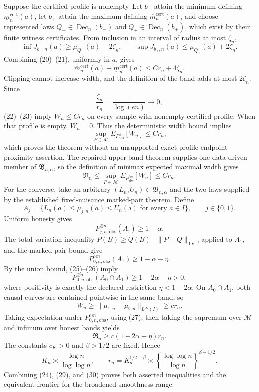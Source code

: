 Suppose the certified profile is nonempty.  Let \(b_-\) attain the minimum defining \(\underline m_n^{\mathrm{cert}}(a)\), let \(b_+\) attain the maximum defining \(\overline m_n^{\mathrm{cert}}(a)\), and choose represented laws \(Q_-\in\operatorname{Dec}_n(b_-)\) and \(Q_+\in\operatorname{Dec}_n(b_+)\), which exist by their finite witness certificates.  From inclusion in an interval of radius at most \(\zeta_n\),
\[
 \inf J_{b_-,n}(a)\ge\mu_{Q_-}(a)-2\zeta_n,
 \qquad
 \sup J_{b_+,n}(a)\le\mu_{Q_+}(a)+2\zeta_n.                 \tag{21}
\]
Combining (20)--(21), uniformly in \(a\), gives
\[
 \overline m_n^{\mathrm{cert}}(a)-
 \underline m_n^{\mathrm{cert}}(a)
 \le C r_n+4\zeta_n.                                        \tag{22}
\]
Clipping cannot increase width, and the definition of the band adds at most \(2\zeta_n\).  Since
\[
 \frac{\zeta_n}{r_n}=\frac1{\log(en)}\longrightarrow0,      \tag{23}
\]
(22)--(23) imply \(W_n\le C r_n\) on every sample with nonempty certified profile.  When that profile is empty, \(W_n=0\).  Thus the deterministic width bound implies
\[
 \sup_{P\in\mathcal M}
 E_{P_{\mathrm{obs}}^{\otimes n}}[W_n]\le C r_n,
\]
which proves the theorem without an unsupported exact-profile endpoint-proximity assertion.
The repaired upper-band theorem supplies one data-driven member of \(\mathfrak B_{n,\alpha}\), so the definition of minimax expected maximal width gives
\[
 \mathfrak R_n
 \le\sup_{P\in\mathcal M}E_{P_{\mathrm{obs}}^{\otimes n}}[W_n]
 \le C r_n.                                                   \tag{24}
\]
For the converse, take an arbitrary \((L_n,U_n)\in\mathfrak B_{n,\alpha}\) and the two laws supplied by the established fixed-nuisance marked-pair theorem.  Define
\[
 A_j=\{L_n(a)\le\mu_{j,n}(a)\le U_n(a)
          \text{ for every }a\in I\},\qquad j\in\{0,1\}.
\]
Uniform honesty gives
\[
 P_{j,n,\mathrm{obs}}^{\otimes n}(A_j)\ge1-\alpha.           \tag{25}
\]
The total-variation inequality \(P(B)\ge Q(B)-\|P-Q\|_{\mathrm{TV}}\), applied to \(A_1\), and the marked-pair bound give
\[
 P_{0,n,\mathrm{obs}}^{\otimes n}(A_1)
 \ge1-\alpha-\eta.                                          \tag{26}
\]
By the union bound, (25)--(26) imply
\[
 P_{0,n,\mathrm{obs}}^{\otimes n}(A_0\cap A_1)
 \ge1-2\alpha-\eta>0,                                       \tag{27}
\]
where positivity is exactly the declared restriction \(\eta<1-2\alpha\).  On \(A_0\cap A_1\), both causal curves are contained pointwise in the same band, so
\[
 W_n\ge\|\mu_{1,n}-\mu_{0,n}\|_{L^\infty(I)}\ge c r_n.     \tag{28}
\]
Taking expectation under \(P_{0,n,\mathrm{obs}}^{\otimes n}\), using (27), then taking the supremum over \(\mathcal M\) and infimum over honest bands yields
\[
 \mathfrak R_n\ge c(1-2\alpha-\eta)r_n.                     \tag{29}
\]
The constants \(c_K>0\) and \(\beta>1/2\) are fixed.  Hence
\[
 K_n\asymp\frac{\log n}{\log\log n},
 \qquad
 r_n=K_n^{1/2-\beta}
 \asymp\left\{\frac{\log\log n}{\log n}\right\}^{\beta-1/2}. \tag{30}
\]
Combining (24), (29), and (30) proves both asserted inequalities and the equivalent frontier for the broadened smoothness range.
